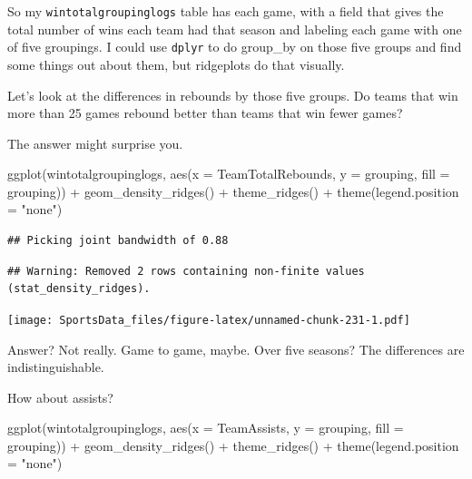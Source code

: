 \documentclass[
]{book}
\newenvironment{Shaded}{\begin{snugshade}}{\end{snugshade}}
\newcommand{\AttributeTok}[1]{\textcolor[rgb]{0.77,0.63,0.00}{#1}}
\newcommand{\FunctionTok}[1]{\textcolor[rgb]{0.00,0.00,0.00}{#1}}
\newcommand{\NormalTok}[1]{#1}
\newcommand{\SpecialCharTok}[1]{\textcolor[rgb]{0.00,0.00,0.00}{#1}}
\newcommand{\StringTok}[1]{\textcolor[rgb]{0.31,0.60,0.02}{#1}}
\begin{document}
So my \texttt{wintotalgroupinglogs} table has each game, with a field that gives the total number of wins each team had that season and labeling each game with one of five groupings. I could use \texttt{dplyr} to do group\_by on those five groups and find some things out about them, but ridgeplots do that visually.

Let's look at the differences in rebounds by those five groups. Do teams that win more than 25 games rebound better than teams that win fewer games?

The answer might surprise you.

\begin{Shaded}
\begin{Highlighting}[]
\FunctionTok{ggplot}\NormalTok{(wintotalgroupinglogs, }\FunctionTok{aes}\NormalTok{(}\AttributeTok{x =}\NormalTok{ TeamTotalRebounds, }\AttributeTok{y =}\NormalTok{ grouping, }\AttributeTok{fill =}\NormalTok{ grouping)) }\SpecialCharTok{+}
  \FunctionTok{geom\_density\_ridges}\NormalTok{() }\SpecialCharTok{+}
  \FunctionTok{theme\_ridges}\NormalTok{() }\SpecialCharTok{+} 
  \FunctionTok{theme}\NormalTok{(}\AttributeTok{legend.position =} \StringTok{"none"}\NormalTok{)}
\end{Highlighting}
\end{Shaded}

\begin{verbatim}
## Picking joint bandwidth of 0.88
\end{verbatim}

\begin{verbatim}
## Warning: Removed 2 rows containing non-finite values (stat_density_ridges).
\end{verbatim}

\texttt{[image: SportsData\_files/figure-latex/unnamed-chunk-231-1.pdf]}

Answer? Not really. Game to game, maybe. Over five seasons? The differences are indistinguishable.

How about assists?

\begin{Shaded}
\begin{Highlighting}[]
\FunctionTok{ggplot}\NormalTok{(wintotalgroupinglogs, }\FunctionTok{aes}\NormalTok{(}\AttributeTok{x =}\NormalTok{ TeamAssists, }\AttributeTok{y =}\NormalTok{ grouping, }\AttributeTok{fill =}\NormalTok{ grouping)) }\SpecialCharTok{+}
  \FunctionTok{geom\_density\_ridges}\NormalTok{() }\SpecialCharTok{+}
  \FunctionTok{theme\_ridges}\NormalTok{() }\SpecialCharTok{+} 
  \FunctionTok{theme}\NormalTok{(}\AttributeTok{legend.position =} \StringTok{"none"}\NormalTok{)}
\end{Highlighting}
\end{Shaded}
\end{document}
